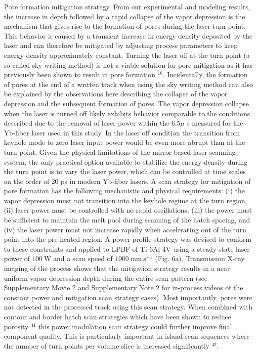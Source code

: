 \documentclass[10pt]{article}
\begin{document}
Pore formation mitigation strategy. From our experimental and modeling results, the increase in depth followed by a rapid collapse of the vapor depression is the mechanism that gives rise to the formation of pores during the laser turn point. This behavior is caused by a transient increase in energy density deposited by the laser and can therefore be mitigated by adjusting process parameters to keep energy density approximately constant. Turning the laser off at the turn point (a so-called sky writing method) is not a viable solution for pore mitigation as it has previously been shown to result in pore formation ${ }^{16}$. Incidentally, the formation of pores at the end of a written track when using the sky writing method can also be explained by the observations here describing the collapse of the vapor depression and the subsequent formation of pores. The vapor depression collapse when the laser is turned off likely exhibits behavior comparable to the conditions described due to the removal of laser power within the $6.5 \mu$ s measured for the $\mathrm{Yb}$-fiber laser used in this study. In the laser off condition the transition from keyhole mode to zero laser input power would be even more abrupt than at the turn point. Given the physical limitations of the mirror-based laser scanning system, the only practical option available to stabilize the energy density during the turn point is to vary the laser power, which can be controlled at time scales on the order of 20 ps in modern Yb-fiber lasers. A scan strategy for mitigation of pore formation has the following mechanistic and physical requirements: (i) the vapor depression must not transition into the keyhole regime at the turn region, (ii) laser power must be controlled with no rapid oscillations, (iii) the power must be sufficient to maintain the melt pool during scanning of the hatch spacing, and (iv) the laser power must not increase rapidly when accelerating out of the turn point into the pre-heated region. A power profile strategy was devised to conform to these constraints and applied to LPBF of Ti-6Al-4V using a steady-state laser power of $100 \mathrm{~W}$ and a scan speed of $1000 \mathrm{~mm} \mathrm{~s}^{-1}$ (Fig. 6a). Transmission X-ray imaging of the process shows that the mitigation strategy results in a near uniform vapor depression depth during the entire scan pattern (see Supplementary Movie 2 and Supplementary Note 2 for in-process videos of the constant power and mitigation scan strategy cases). Most importantly, pores were not detected in the processed track using this scan strategy. When combined with contour and border hatch scan strategies which have been shown to reduce porosity ${ }^{41}$ this power modulation scan strategy could further improve final component quality. This is particularly important in island scan sequences where the number of turn points per volume slice is increased significantly ${ }^{42}$.
\end{document}
